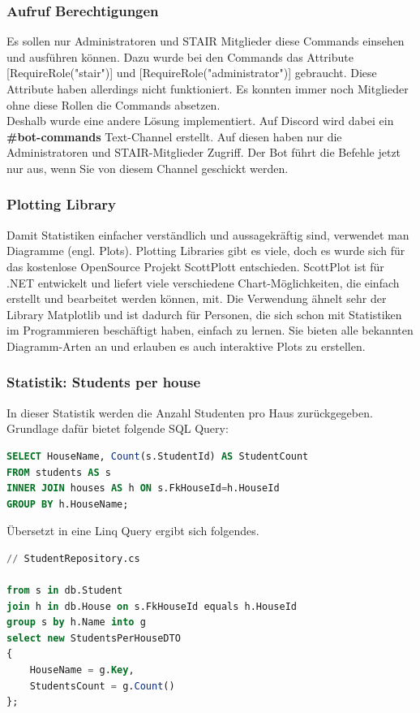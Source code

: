 \documentclass[a4paper, table]{article}
\begin{document}
\subsubsection*{Aufruf Berechtigungen}
Es sollen nur Administratoren und STAIR Mitglieder diese Commands einsehen und ausführen können.
Dazu wurde bei den Commands das Attribute [RequireRole("stair")] und [RequireRole("administrator")] gebraucht.
Diese Attribute haben allerdings nicht funktioniert.
Es konnten immer noch Mitglieder ohne diese Rollen die Commands absetzen.\\
Deshalb wurde eine andere Lösung implementiert.
Auf Discord wird dabei ein \textbf{\#bot-commands} Text-Channel erstellt.
Auf diesen haben nur die Administratoren und STAIR-Mitglieder Zugriff.
Der Bot führt die Befehle jetzt nur aus, wenn Sie von diesem Channel geschickt werden.

\subsubsection*{Plotting Library}
Damit Statistiken einfacher verständlich und aussagekräftig sind, verwendet man Diagramme (engl. Plots).
Plotting Libraries gibt es viele, doch es wurde sich für das kostenlose OpenSource Projekt ScottPlott entschieden.
ScottPlot ist für .NET entwickelt und liefert viele verschiedene Chart-Möglichkeiten, die einfach erstellt und bearbeitet werden können, mit.
Die Verwendung ähnelt sehr der Library Matplotlib und ist dadurch für Personen, die sich schon mit Statistiken im Programmieren beschäftigt haben, einfach zu lernen.
Sie bieten alle bekannten Diagramm-Arten an und erlauben es auch interaktive Plots zu erstellen. \autocite{noauthor_scottplot_nodate}

\newpage
\subsubsection*{Statistik: Students per house}
In dieser Statistik werden die Anzahl Studenten pro Haus zurückgegeben.
Grundlage dafür bietet folgende SQL Query:

\begin{lstlisting}[language=SQL]
SELECT HouseName, Count(s.StudentId) AS StudentCount
FROM students AS s
INNER JOIN houses AS h ON s.FkHouseId=h.HouseId
GROUP BY h.HouseName;
\end{lstlisting}

Übersetzt in eine Linq Query ergibt sich folgendes.

\begin{lstlisting}[language=SQL]
// StudentRepository.cs

from s in db.Student
join h in db.House on s.FkHouseId equals h.HouseId
group s by h.Name into g
select new StudentsPerHouseDTO
{
    HouseName = g.Key,
    StudentsCount = g.Count()
};
\end{lstlisting}
\end{document}
